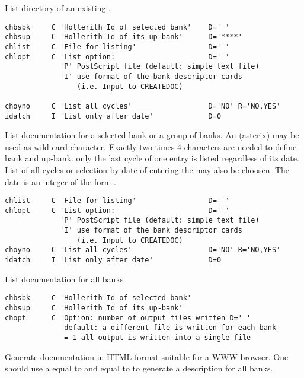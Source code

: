List directory of an existing \RZfile.

{}
 
\begin{verbatim}
chbsbk     C 'Hollerith Id of selected bank'    D=' '
chbsup     C 'Hollerith Id of its up-bank'      D='****'
chlist     C 'File for listing'                 D=' '
chlopt     C 'List option:                      D=' '
             'P' PostScript file (default: simple text file)
             'I' use format of the bank descriptor cards
                 (i.e. Input to CREATEDOC)   
 
choyno     C 'List all cycles'                  D='NO' R='NO,YES'
idatch     I 'List only after date'             D=0
\end{verbatim}
 
List documentation for a selected bank or a group of banks.
An  (asterix) may be used as wild card character.
Exactly two times 4 characters are needed to define bank and up-bank.
only the last cycle of one entry is listed regardless of its date.
List of all cycles or selection by date of entering the \RZfile{} may
also be choosen. The date is an integer of the form .
 
 
\begin{verbatim}
chlist     C 'File for listing'                 D=' '
chlopt     C 'List option:                      D=' '
             'P' PostScript file (default: simple text file)
             'I' use format of the bank descriptor cards
                 (i.e. Input to CREATEDOC)   
choyno     C 'List all cycles'                  D='NO' R='NO,YES'
idatch     I 'List only after date'             D=0
\end{verbatim}
 
List documentation for all banks
 

\begin{verbatim}
chbsbk     C 'Hollerith Id of selected bank'
chbsup     C 'Hollerith Id of its up-bank'
chopt      C 'Option: number of output files written D=' '
              default: a different file is written for each bank
              = 1 all output is written into a single file
\end{verbatim}

Generate documentation in HTML format suitable for a WWW browser. 
One should use a  equal to  
and  equal to  to generate a description
for all banks.

